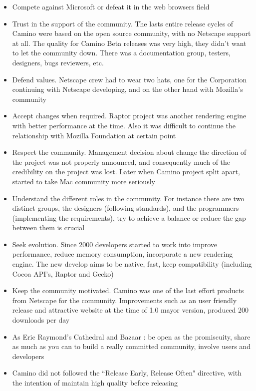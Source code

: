 \documentclass[11pt]{article} %
\begin{document}
  	\begin{itemize}
  	  \item Compete against Microsoft or defeat it in the web browsers field
  	  \item Trust in the support of the community. The lasts entire release cycles of Camino were based on the open source community, with no Netscape support at all. The quality for Camino Beta releases was very high, they didn't want to let the community down. There was a documentation group, testers, designers, bugs reviewers, etc.
  	  \item Defend values. Netscape crew had to wear two hats, one for the Corporation continuing with Netscape developing, and on the other hand with Mozilla's community
  	  \item Accept changes when required. Raptor project was another rendering engine with better performance at the time. Also it was difficult to continue the relationship with Mozilla Foundation at certain point
  	  \item Respect the community. Management decision about change the direction of the project was not properly announced, and consequently much of the credibility on the project was lost. Later when Camino project split apart, started to take Mac community more seriously
  	  \item Understand the different roles in the community. For instance there are two distinct groups, the designers (following standards), and the programmers (implementing the requirements), try to achieve a balance or ​​reduce the gap between them is crucial
  	  \item Seek evolution. Since 2000 developers started to work into improve performance, reduce memory consumption, incorporate a new rendering engine. The new develop aims to be native, fast, keep compatibility (including Cocoa API's, Raptor and Gecko)
  	  \item Keep the community motivated. Camino was one of the last effort products from Netscape for the community. Improvements such as an user friendly release and attractive website at the time of 1.0 mayor version, produced 200 downloads per day
  	  \item As Eric Raymond's Cathedral and Bazaar \cite{Raymond:1999er}: be open as the promiscuity, share as much as you can to build a really committed community, involve users and developers
  	  \item Camino did not followed the ``Release Early, Release Often" directive, with the intention of maintain high quality before releasing

\end{itemize}
\end{document}
